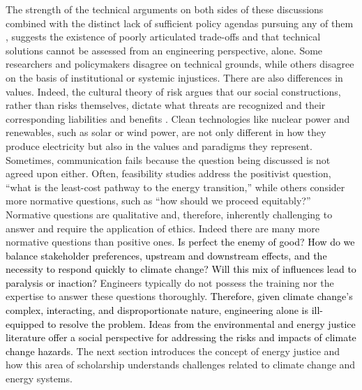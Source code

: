 The strength of the technical arguments on both sides of these discussions
combined with the distinct lack of sufficient policy agendas pursuing any of
them \cite{roelfsema_taking_2020,hale_assessing_2022}, suggests the existence of
poorly articulated trade-offs and that technical solutions cannot be assessed
from an engineering perspective, alone. Some researchers and policymakers
disagree on technical grounds, while others disagree on the basis of
institutional or systemic injustices. There are also differences in values.
Indeed, the cultural theory of risk argues that our social constructions, rather
than risks themselves, dictate what threats are recognized and their
corresponding liabilities and benefits \cite{mcneeley_cultural_2014,
van_de_graaff_understanding_2016}. Clean technologies like nuclear power and
renewables, such as solar or wind power, are not only different in how they
produce electricity but also in the values and paradigms they represent.
Sometimes, communication fails because the question being discussed is not
agreed upon either. Often, feasibility studies address the positivist question,
``what is the least-cost pathway to the energy transition,'' while others
consider more normative questions, such as ``how should we proceed equitably?''
Normative questions are qualitative and, therefore, inherently challenging to
answer and require the application of ethics. Indeed there are many more
normative questions than positive ones. \textcolor{black}{Is perfect the enemy
of good? How do we balance stakeholder preferences, upstream and downstream
effects, and the necessity to respond quickly to climate change? Will this mix
of influences lead to paralysis or inaction?} 
Engineers typically do not possess the training nor the expertise to answer these questions
thoroughly.
\textcolor{black}{Therefore, given climate
change's complex, interacting, and disproportionate nature, engineering alone is
ill-equipped to resolve the problem. Ideas from the environmental and energy
justice literature offer a social perspective for addressing the risks and
impacts of climate change hazards.}
The next section introduces the concept of energy justice and how this area of
scholarship understands challenges related to climate change and energy systems.

